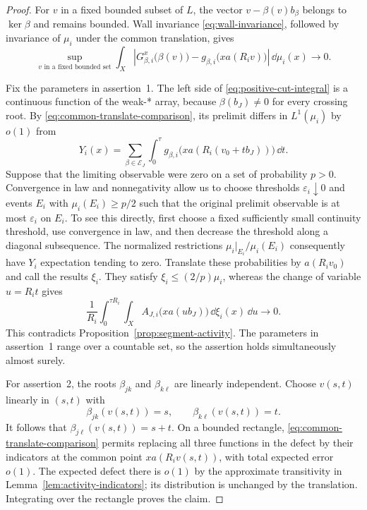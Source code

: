 \begin{proof}
For $v$ in a fixed bounded subset of $L$, the vector
$v-\beta(v)b_\beta$ belongs to $\ker\beta$ and remains bounded.
Wall invariance \eqref{eq:wall-invariance}, followed by invariance of
$\mu_i$ under the common translation, gives
\begin{equation}\label{eq:common-translate-comparison}
 \sup_{v\text{ in a fixed bounded set}}
 \int_X\left|
 G_{\beta,i}^{x}\bigl(\beta(v)\bigr)
 -g_{\beta,i}\bigl(xa(R_i v)\bigr)
 \right|\,\dd\mu_i(x)\longrightarrow0.
\end{equation}

Fix the parameters in assertion~1.  The left side of
\eqref{eq:positive-cut-integral} is a continuous function of the
weak-* array, because $\beta(b_J)\ne0$ for every crossing root.
By \eqref{eq:common-translate-comparison}, its prelimit differs in
$L^1(\mu_i)$ by $o(1)$ from
\[
 Y_i(x)=\sum_{\beta\in\mathcal E_J}\int_0^\tau
 g_{\beta,i}\bigl(xa(R_i(v_0+t b_J))\bigr)\,\dd t.
\]
Suppose that the limiting observable were zero on a set of probability
$p>0$.  Convergence in law and nonnegativity allow us to choose thresholds
$\varepsilon_i\downarrow0$ and events $E_i$ with
$\mu_i(E_i)\geq p/2$ such that the original prelimit observable is at
most $\varepsilon_i$ on $E_i$.  To see this directly, first choose a
fixed sufficiently small continuity threshold, use convergence in law,
and then decrease the threshold along a diagonal subsequence.
The normalized restrictions $\mu_i|_{E_i}/\mu_i(E_i)$ consequently have
$Y_i$ expectation tending to zero.  Translate these probabilities by
$a(R_i v_0)$ and call the results $\xi_i$.  They satisfy
$\xi_i\leq(2/p)\mu_i$, whereas the change of variable $u=R_i t$
gives
\[
 \frac1{R_i}\int_0^{\tau R_i}\int_X
 A_{J,i}\bigl(xa(u b_J)\bigr)\,\dd\xi_i(x)\,\dd u
 \longrightarrow0.
\]
This contradicts Proposition~\ref{prop:segment-activity}.  The parameters
in assertion~1 range over a countable set, so the assertion holds
simultaneously almost surely.

For assertion~2, the roots $\beta_{jk}$ and $\beta_{k\ell}$ are linearly
independent.  Choose $v(s,t)$ linearly in $(s,t)$ with
\[
 \beta_{jk}(v(s,t))=s,\qquad
 \beta_{k\ell}(v(s,t))=t.
\]
It follows that $\beta_{j\ell}(v(s,t))=s+t$.  On a bounded rectangle,
\eqref{eq:common-translate-comparison} permits replacing all three
functions in the defect by their indicators at the common point
$xa(R_i v(s,t))$, with total expected error $o(1)$.  The expected defect
there is $o(1)$ by the approximate transitivity in
Lemma~\ref{lem:activity-indicators}; its distribution is unchanged by
the translation.  Integrating over the rectangle proves the claim.
\end{proof}

